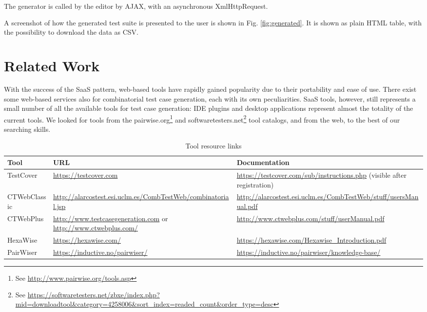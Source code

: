 \begin{tikzborder}{\cite{Gargantini16:validation}}
\begin{tikzborder}{\cite{gargantini_combinatorial_2017}}
\begin{tikzborder}{\cite{garn2019}}
\begin{tikzborder}{\cite{arcaini2019achieving}}
\begin{tikzborder}{}
The generator is called by the editor by AJAX, with an asynchronous XmlHttpRequest.

A screenshot of how the generated test suite is presented to the user is shown in Fig. \ref{fig:generated}. 
It is shown as plain HTML table, with the possibility to download the data as CSV. 
\end{tikzborder}

\section{Related Work}\label{sec:related2}

\begin{tikzborder}{}
With the success of the SaaS pattern, web-based tools have rapidly gained popularity due to their portability and ease of use. There exist some web-based services also for combinatorial test case generation, each with its own peculiarities. SaaS tools, however, still represents a small number of all the available tools for test case generation: IDE plugins and desktop applications represent almost the totality of the current tools. We looked for tools from the pairwise.org\footnote{See \url{http://www.pairwise.org/tools.asp}} and softwaretesters.net\footnote{See \url{https://softwaretesters.net/zbxe/index.php?mid=downloadtool&category=4258006&sort_index=readed_count&order_type=desc}} tool catalogs, and from the web, to the best of our searching skills. 
\end{tikzborder}

\begin{table}[!hbt]
	\centering
	\footnotesize
	\setlength\tabcolsep{2pt}
	\begin{tabular}{l P{52mm} P{52mm}}
		Tool & URL & Documentation \\
		\toprule
		TestCover & \url{https://testcover.com} & \url{https://testcover.com/sub/instructions.php} (visible after registration) \\
		\midrule
		CTWebClassic & \url{http://alarcostest.esi.uclm.es/CombTestWeb/combinatorial.jsp} & \url{http://alarcostest.esi.uclm.es/CombTestWeb/stuff/usersManual.pdf} \\
		\midrule
		CTWebPlus & \url{http://www.testcasegeneration.com} or \url{http://www.ctwebplus.com/} & \url{http://www.ctwebplus.com/stuff/userManual.pdf} \\
		\midrule
		HexaWise & \url{https://hexawise.com/} & \url{https://hexawise.com/Hexawise_Introduction.pdf} \\
		\midrule
		PairWiser & \url{https://inductive.no/pairwiser/} & \url{https://inductive.no/pairwiser/knowledge-base/} \\
		\bottomrule
	\end{tabular}\caption{Tool resource links}\label{tab:docs}
\end{table}


\end{tikzborder}
\end{tikzborder}
\end{tikzborder}
\end{tikzborder}
